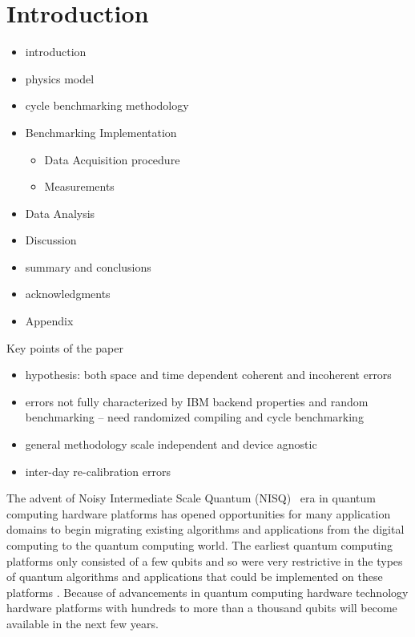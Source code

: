 

\section{Introduction}
\label{sec:intro}

\begin{itemize}
    \item introduction
\item physics model
\item cycle benchmarking methodology
\item Benchmarking Implementation
\begin{itemize}
    \item Data Acquisition procedure
    \item Measurements
\end{itemize}
\item Data Analysis
\item Discussion
\item summary and conclusions
\item acknowledgments
\item Appendix
\end{itemize}



Key points of the paper
\begin{itemize}
\item hypothesis: both space and time dependent coherent and incoherent errors
\item 	errors not fully characterized by IBM backend properties and random benchmarking – need randomized compiling and cycle benchmarking
\item  general methodology scale independent and device agnostic
\item inter-day re-calibration errors 
\end{itemize}

The advent of Noisy Intermediate Scale Quantum (NISQ)~\cite{Preskill2018quantumcomputingin} era in quantum computing hardware platforms has opened opportunities for many application domains to begin migrating existing algorithms and applications from the digital computing to the quantum computing world.  The earliest quantum computing platforms only consisted of a few qubits and so were very restrictive in the types of quantum algorithms and applications that could be implemented on these platforms .  Because of advancements in quantum computing hardware technology hardware platforms with hundreds to more than a thousand qubits will become available in the next few years.  

